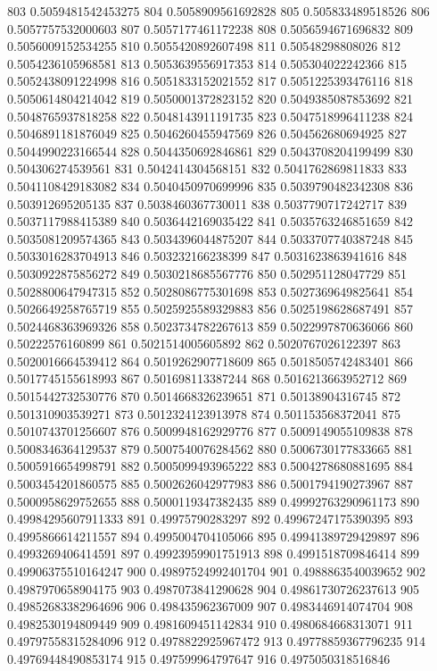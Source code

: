803 0.5059481542453275
804 0.5058909561692828
805 0.505833489518526
806 0.5057757532000603
807 0.5057177461172238
808 0.5056594671696832
809 0.5056009152534255
810 0.5055420892607498
811 0.50548298808026
812 0.5054236105968581
813 0.5053639556917353
814 0.505304022242366
815 0.5052438091224998
816 0.5051833152021552
817 0.5051225393476116
818 0.5050614804214042
819 0.5050001372823152
820 0.5049385087853692
821 0.5048765937818258
822 0.5048143911191735
823 0.5047518996411238
824 0.5046891181876049
825 0.5046260455947569
826 0.504562680694925
827 0.5044990223166544
828 0.5044350692846861
829 0.5043708204199499
830 0.504306274539561
831 0.5042414304568151
832 0.5041762869811833
833 0.5041108429183082
834 0.5040450970699996
835 0.5039790482342308
836 0.503912695205135
837 0.5038460367730011
838 0.5037790717242717
839 0.5037117988415389
840 0.5036442169035422
841 0.5035763246851659
842 0.5035081209574365
843 0.5034396044875207
844 0.5033707740387248
845 0.5033016283704913
846 0.503232166238399
847 0.5031623863941616
848 0.5030922875856272
849 0.5030218685567776
850 0.502951128047729
851 0.5028800647947315
852 0.5028086775301698
853 0.5027369649825641
854 0.5026649258765719
855 0.5025925589329883
856 0.5025198628687491
857 0.5024468363969326
858 0.5023734782267613
859 0.5022997870636066
860 0.50222576160899
861 0.5021514005605892
862 0.5020767026122397
863 0.5020016664539412
864 0.5019262907718609
865 0.5018505742483401
866 0.5017745155618993
867 0.501698113387244
868 0.5016213663952712
869 0.5015442732530776
870 0.5014668326239651
871 0.50138904316745
872 0.501310903539271
873 0.5012324123913978
874 0.501153568372041
875 0.5010743701256607
876 0.5009948162929776
877 0.5009149055109838
878 0.5008346364129537
879 0.5007540076284562
880 0.5006730177833665
881 0.5005916654998791
882 0.5005099493965222
883 0.5004278680881695
884 0.5003454201860575
885 0.5002626042977983
886 0.5001794190273967
887 0.5000958629752655
888 0.5000119347382435
889 0.49992763290961173
890 0.49984295607911333
891 0.49975790283297
892 0.49967247175390395
893 0.4995866614211557
894 0.4995004704105066
895 0.49941389729429897
896 0.4993269406414591
897 0.49923959901751913
898 0.4991518709846414
899 0.49906375510164247
900 0.49897524992401704
901 0.4988863540039652
902 0.4987970658904175
903 0.4987073841290628
904 0.49861730726237613
905 0.49852683382964696
906 0.498435962367009
907 0.4983446914074704
908 0.4982530194809449
909 0.4981609451142834
910 0.4980684668313071
911 0.49797558315284096
912 0.4978822925967472
913 0.49778859367796235
914 0.49769448490853174
915 0.497599964797647
916 0.4975050318516846
